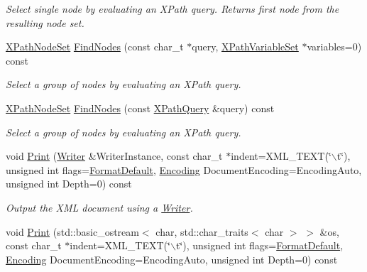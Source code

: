 \begin{DoxyCompactItemize}
\begin{DoxyCompactList}\small\item\em Select single node by evaluating an XPath query. Returns first node from the resulting node set. \item\end{DoxyCompactList}\item 
\hyperlink{classphys_1_1xml_1_1XPathNodeSet}{XPathNodeSet} \hyperlink{classphys_1_1xml_1_1Node_a7390ba1c09b83544365abc7bf8ec5b8f}{FindNodes} (const char\_\-t $\ast$query, \hyperlink{classphys_1_1xml_1_1XPathVariableSet}{XPathVariableSet} $\ast$variables=0) const 
\begin{DoxyCompactList}\small\item\em Select a group of nodes by evaluating an XPath query. \item\end{DoxyCompactList}\item 
\hyperlink{classphys_1_1xml_1_1XPathNodeSet}{XPathNodeSet} \hyperlink{classphys_1_1xml_1_1Node_a466766bf750da2a04acd8a32d2b8a458}{FindNodes} (const \hyperlink{classphys_1_1xml_1_1XPathQuery}{XPathQuery} \&query) const 
\begin{DoxyCompactList}\small\item\em Select a group of nodes by evaluating an XPath query. \item\end{DoxyCompactList}\item 
void \hyperlink{classphys_1_1xml_1_1Node_adbe10968a804a94552e1dc8223744406}{Print} (\hyperlink{classphys_1_1xml_1_1Writer}{Writer} \&WriterInstance, const char\_\-t $\ast$indent=XML\_\-TEXT(\char`\"{}$\backslash$t\char`\"{}), unsigned int flags=\hyperlink{namespacephys_1_1xml_a08bf6aab51f79929d9097706a5e64408}{FormatDefault}, \hyperlink{namespacephys_1_1xml_a420f5de782438f88160321385bea2015}{Encoding} DocumentEncoding=EncodingAuto, unsigned int Depth=0) const 
\begin{DoxyCompactList}\small\item\em Output the XML document using a \hyperlink{classphys_1_1xml_1_1Writer}{Writer}. \item\end{DoxyCompactList}\item 
void \hyperlink{classphys_1_1xml_1_1Node_aa4076d6ea0db2e5f5c720770bf02349e}{Print} (std::basic\_\-ostream$<$ char, std::char\_\-traits$<$ char $>$ $>$ \&os, const char\_\-t $\ast$indent=XML\_\-TEXT(\char`\"{}$\backslash$t\char`\"{}), unsigned int flags=\hyperlink{namespacephys_1_1xml_a08bf6aab51f79929d9097706a5e64408}{FormatDefault}, \hyperlink{namespacephys_1_1xml_a420f5de782438f88160321385bea2015}{Encoding} DocumentEncoding=EncodingAuto, unsigned int Depth=0) const 

\end{DoxyCompactItemize}
